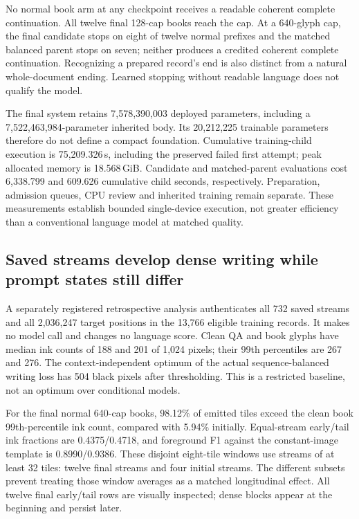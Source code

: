 No normal book arm at any checkpoint receives a readable coherent complete
continuation. All twelve final 128-cap books reach the cap. At a 640-glyph cap,
the final candidate stops on eight of twelve normal prefixes and the matched
balanced parent stops on seven; neither produces a credited coherent complete
continuation. Recognizing a prepared record's end is also distinct from a
natural whole-document ending. Learned stopping without readable language
does not qualify the model.

The final system retains 7,578,390,003 deployed parameters, including a
7,522,463,984-parameter inherited body. Its 20,212,225 trainable parameters
therefore do not define a compact foundation. Cumulative training-child
execution is 75,209.326\,s, including the preserved failed first attempt;
peak allocated memory is 18.568\,GiB. Candidate and matched-parent evaluations
cost 6,338.799 and 609.626 cumulative child seconds, respectively. Preparation,
admission queues, CPU review and inherited training remain separate. These
measurements establish bounded single-device execution, not greater efficiency
than a conventional language model at matched quality.

\subsection*{Saved streams develop dense writing while prompt states still differ}
A separately registered retrospective analysis authenticates all 732 saved
streams and all 2,036,247 target positions in the 13,766 eligible training
records. It makes no model call and changes no language score. Clean QA and
book glyphs have median ink counts of 188 and 201 of 1,024 pixels; their
99th percentiles are 267 and 276. The context-independent optimum of the actual
sequence-balanced writing loss has 504 black pixels after thresholding.
This is a restricted baseline, not an optimum over conditional models.

For the final normal 640-cap books, 98.12\% of emitted tiles exceed the clean
book 99th-percentile ink count, compared with 5.94\% initially. Equal-stream
early/tail ink fractions are 0.4375/0.4718, and foreground F1 against the
constant-image template is 0.8990/0.9386. These disjoint eight-tile windows use
streams of at least 32 tiles: twelve final streams and four initial streams.
The different subsets prevent treating those window averages as a matched
longitudinal effect. All twelve final early/tail rows are visually inspected;
dense blocks appear at the beginning and persist later.

